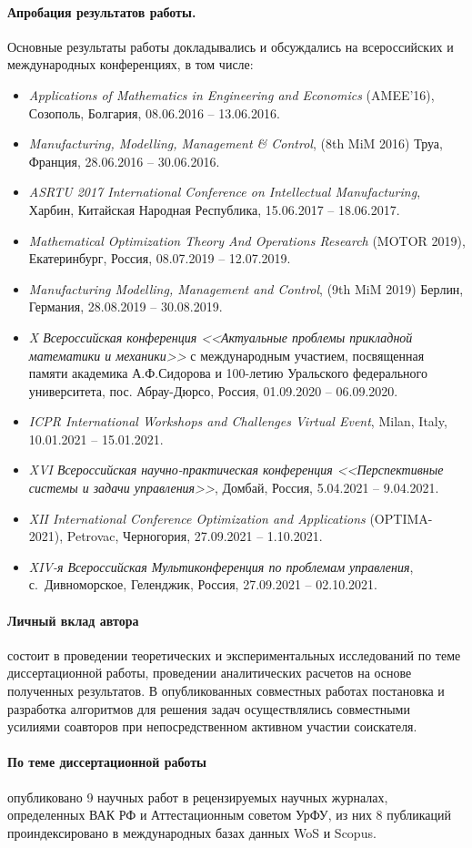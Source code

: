 \paragraph*{Апробация результатов работы.}
Основные результаты работы докладывались и обсуждались на всероссийских и международных конференциях, в том числе:

\begin{itemize}
    \item
    \textit{Applications of Mathematics in Engineering and Economics}
    (AMEE'16),
    Созополь, Болгария,
    08.06.2016 -- 13.06.2016.
    \item
    \textit{Manufacturing, Modelling, Management \& Control},
    (8th MiM 2016)
    Труа, Франция,
    28.06.2016 -- 30.06.2016.
    \item
    \textit{ASRTU 2017 International Conference on Intellectual Manufacturing},
    Харбин, Китайская Народная Республика,
    15.06.2017 -- 18.06.2017.
    \item
    \textit{Mathematical Optimization Theory And Operations Research}
    (MOTOR 2019),
    Екатеринбург, Россия,
    08.07.2019 -- 12.07.2019.
    \item
    \textit{Manufacturing Modelling, Management and Control},
    (9th MiM 2019)
    Берлин, Германия,
    28.08.2019 -- 30.08.2019.
    \item
    \textit{X Всероссийская конференция
    <<Актуальные проблемы прикладной математики и механики>>}
    с международным участием,
    посвященная памяти академика А.Ф.Сидорова и 100-летию Уральского федерального университета,
    пос. Абрау-Дюрсо, Россия,
    01.09.2020 -- 06.09.2020.
    \item
    \textit{ICPR International Workshops and Challenges Virtual Event},
    Milan, Italy,
    10.01.2021 -- 15.01.2021.
    \item
    \textit{XVI Всероссийская научно-практическая конференция
    <<Перспективные системы и задачи управления>>},
    Домбай, Россия,
    5.04.2021 -- 9.04.2021.
    \item
    \textit{XII International Conference Optimization and Applications}
    (OPTIMA-2021),
    Petrovac, Черногория,
    27.09.2021 -- 1.10.2021.
    \item
    \textit{XIV-я Всероссийская Мультиконференция по проблемам управления},
    с.~Дивноморское, Геленджик, Россия,
    27.09.2021 -- 02.10.2021.
\end{itemize}

\paragraph*{Личный вклад автора}
состоит в проведении теоретических и экспериментальных исследований
по теме диссертационной работы,
проведении аналитических расчетов на основе полученных результатов.
В опубликованных совместных работах постановка и разработка алгоритмов для
решения задач осуществлялись совместными усилиями соавторов
при непосредственном активном участии соискателя.

\paragraph*{По теме диссертационной работы}
опубликовано
9 научных работ
в рецензируемых научных журналах,
определенных ВАК РФ и
Аттестационным советом УрФУ,
из них
8 публикаций проиндексировано в международных базах данных
WoS и Scopus.
